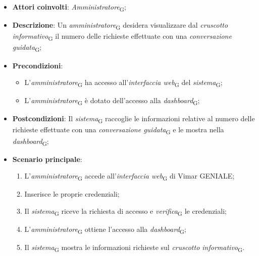 \begin{itemize}
    \item \textbf{Attori coinvolti}: \textit{Amministratore}\textsubscript{G};
    \item \textbf{Descrizione}: Un \textit{amministratore}\textsubscript{G} desidera visualizzare dal \textit{cruscotto informativo}\textsubscript{G} il numero delle richieste effettuate con una \textit{conversazione guidata}\textsubscript{G};
    \item \textbf{Precondizioni}: 
        \begin{itemize}
            \item L’\textit{amministratore}\textsubscript{G} ha accesso all’\textit{interfaccia web}\textsubscript{G} del \textit{sistema}\textsubscript{G};
            \item L’\textit{amministratore}\textsubscript{G} è dotato dell’accesso alla \textit{dashboard}\textsubscript{G};
        \end{itemize}
    \item \textbf{Postcondizioni}: Il \textit{sistema}\textsubscript{G} raccoglie le informazioni relative al numero delle richieste effettuate con una \textit{conversazione guidata}\textsubscript{G} e le mostra nella \textit{dashboard}\textsubscript{G};
    \item \textbf{Scenario principale}:
    \begin{enumerate}
    \item L’\textit{amministratore}\textsubscript{G} accede all’\textit{interfaccia web}\textsubscript{G} di Vimar GENIALE;
    \item Inserisce le proprie credenziali;
    \item Il \textit{sistema}\textsubscript{G} riceve la richiesta di accesso e \textit{verifica}\textsubscript{G} le credenziali;
    \item L’\textit{amministratore}\textsubscript{G} ottiene l’accesso alla \textit{dashboard}\textsubscript{G};
    \item Il \textit{sistema}\textsubscript{G} mostra le informazioni richieste sul \textit{cruscotto informativo}\textsubscript{G}.
    \end{enumerate}
\end{itemize}

